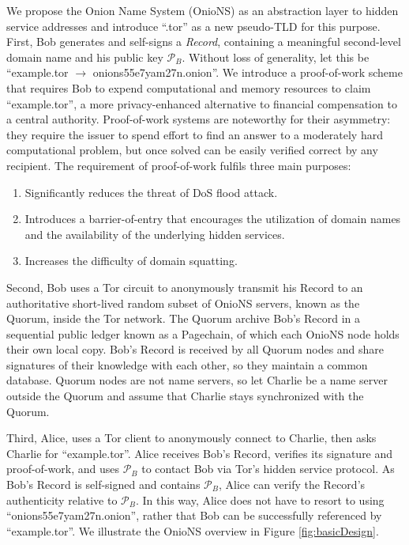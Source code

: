 \documentclass[conference]{IEEEtran}
\begin{document}
We propose the Onion Name System (OnioNS) as an abstraction layer to hidden service addresses and introduce ``.tor'' as a new pseudo-TLD for this purpose. First, Bob generates and self-signs a \emph{Record}, containing a meaningful second-level domain name and his public key $ \mathcal{P}_{B} $. Without loss of generality, let this be ``example.tor $ \rightarrow $ onions55e7yam27n.onion''. We introduce a proof-of-work scheme that requires Bob to expend computational and memory resources to claim ``example.tor'', a more privacy-enhanced alternative to financial compensation to a central authority. Proof-of-work systems are noteworthy for their asymmetry: they require the issuer to spend effort to find an answer to a moderately hard computational problem, but once solved can be easily verified correct by any recipient. The requirement of proof-of-work fulfils three main purposes:

\begin{enumerate}
	\item Significantly reduces the threat of DoS flood attack.
	\item Introduces a barrier-of-entry that encourages the utilization of domain names and the availability of the underlying hidden services.
	\item Increases the difficulty of domain squatting.
\end{enumerate}

Second, Bob uses a Tor circuit to anonymously transmit his Record to an authoritative short-lived random subset of OnioNS servers, known as the Quorum, inside the Tor network. The Quorum archive Bob's Record in a sequential public ledger known as a Pagechain, of which each OnioNS node holds their own local copy. Bob's Record is received by all Quorum nodes and share signatures of their knowledge with each other, so they maintain a common database. Quorum nodes are not name servers, so let Charlie be a name server outside the Quorum and assume that Charlie stays synchronized with the Quorum.

Third, Alice, uses a Tor client to anonymously connect to Charlie, then asks Charlie for ``example.tor''. Alice receives Bob's Record, verifies its signature and proof-of-work, and uses $ \mathcal{P}_{B} $ to contact Bob via Tor's hidden service protocol. As Bob's Record is self-signed and contains $ \mathcal{P}_{B} $, Alice can verify the Record's authenticity relative to $ \mathcal{P}_{B} $. In this way, Alice does not have to resort to using ``onions55e7yam27n.onion'', rather that Bob can be successfully referenced by ``example.tor''. We illustrate the OnioNS overview in Figure \ref{fig:basicDesign}.
\end{document}
